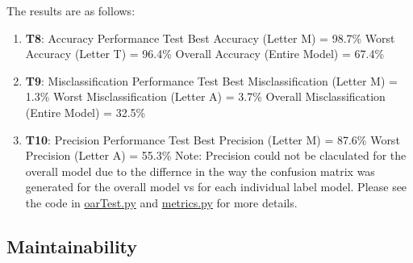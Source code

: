 \documentclass[12pt, titlepage]{article}
\begin{document}
The results are as follows:
\begin{enumerate}
  \item{\textbf{T8}: Accuracy Performance Test}
  Best Accuracy (Letter M) = 98.7\%
  Worst Accuracy (Letter T) = 96.4\%
  Overall Accuracy (Entire Model) = 67.4\%
  \item{\textbf{T9}: Misclassification Performance Test}
  Best Misclassification (Letter M) = 1.3\%
  Worst Misclassification (Letter A) = 3.7\%
  Overall Misclassification (Entire Model) = 32.5\%
  \item{\textbf{T10}: Precision Performance Test}
  Best Precision (Letter M) = 87.6\%
  Worst Precision  (Letter A) = 55.3\%
  Note: Precision could not be claculated for the overall model due to the differnce in the way the confusion matrix was generated for the overall model vs for each
  individual label model. Please see the code in \href{https://github.com/cer-hunter/OAR-CAS741/blob/main/src/oarTest.py}{oarTest.py} and \href{https://github.com/cer-hunter/OAR-CAS741/blob/main/src/oarTest.py}{metrics.py}
  for more details.
\end{enumerate}

\subsection{Maintainability}
\end{document}
